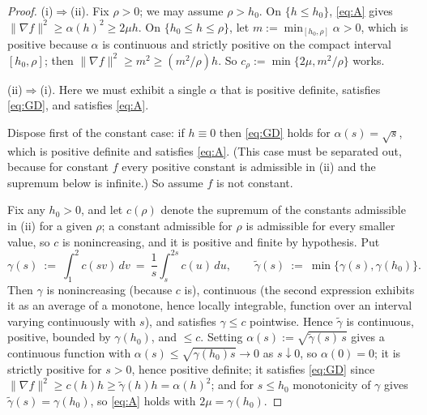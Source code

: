 \documentclass[10pt,a4paper]{amsart}
\begin{document}
\begin{proof}
(i)$\Rightarrow$(ii). Fix $\rho>0$; we may assume $\rho>h_0$. On $\{h\le h_0\}$,
\eqref{eq:A} gives $\|\nabla f\|^2\ge\alpha(h)^2\ge 2\mu h$. On
$\{h_0\le h\le\rho\}$, let $m:=\min_{[h_0,\rho]}\alpha>0$, which is positive
because $\alpha$ is continuous and strictly positive on the compact interval
$[h_0,\rho]$; then $\|\nabla f\|^2\ge m^2\ge (m^2/\rho)h$. So
$c_\rho:=\min\{2\mu, m^2/\rho\}$ works.

(ii)$\Rightarrow$(i). Here we must exhibit a single $\alpha$ that is positive
definite, satisfies \eqref{eq:GD}, and satisfies \eqref{eq:A}.

Dispose first of the constant case: if $h\equiv0$ then \eqref{eq:GD} holds for
$\alpha(s)=\sqrt s$, which is positive definite and satisfies \eqref{eq:A}. (This
case must be separated out, because for constant $f$ every positive constant is
admissible in (ii) and the supremum below is infinite.) So assume $f$ is not
constant.

Fix any $h_0>0$, and let $c(\rho)$ denote the supremum of the constants
admissible in (ii) for a given $\rho$; a constant admissible for $\rho$ is
admissible for every smaller value, so $c$ is nonincreasing, and it is positive
and finite by hypothesis. Put
\[
  \gamma(s) \ :=\ \int_1^2 c(sv)\,dv \ =\ \frac1s\int_s^{2s} c(u)\,du , \qquad
  \tilde\gamma(s) \ :=\ \min\{\gamma(s), \gamma(h_0)\} .
\]
Then $\gamma$ is nonincreasing (because $c$ is), continuous (the second
expression exhibits it as an average of a monotone, hence locally integrable,
function over an interval varying continuously with $s$), and satisfies
$\gamma\le c$ pointwise. Hence $\tilde\gamma$ is continuous, positive, bounded by
$\gamma(h_0)$, and $\le c$. Setting
$\alpha(s):=\sqrt{\tilde\gamma(s)\,s}$ gives a continuous function with
$\alpha(s)\le\sqrt{\gamma(h_0)s}\to0$ as $s\downarrow0$, so $\alpha(0)=0$; it is
strictly positive for $s>0$, hence positive definite; it satisfies \eqref{eq:GD}
since $\|\nabla f\|^2\ge c(h)h\ge\tilde\gamma(h)h=\alpha(h)^2$; and for
$s\le h_0$ monotonicity of $\gamma$ gives $\tilde\gamma(s)=\gamma(h_0)$, so
\eqref{eq:A} holds with $2\mu=\gamma(h_0)$.
\end{proof}
\end{document}

